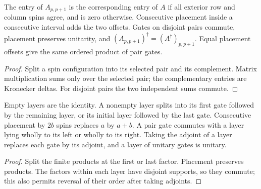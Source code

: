 \begin{lemma}
    \label{lem:mpu_printed_placement}
    \leanok
    The entry of $A_{p,p+1}$ is the corresponding entry of $A$ if all
    exterior row and column spins agree, and is zero otherwise.
    Consecutive placement inside a consecutive interval adds the two
    offsets. Gates on disjoint pairs commute, placement preserves
    unitarity, and $(A_{p,p+1})^\dagger=(A^\dagger)_{p,p+1}$.
    Equal placement offsets give the same ordered product of pair gates.
\end{lemma}
\begin{proof}\leanok
    Split a spin configuration into its selected pair and its complement.
    Matrix multiplication sums only over the selected pair; the
    complementary entries are Kronecker deltas. For disjoint pairs the
    two independent sums commute.
\end{proof}

\begin{lemma}
    \label{lem:mpu_printed_layer_identities}
    \leanok
    Empty layers are the identity. A nonempty layer splits into its first
    gate followed by the remaining layer, or its initial layer followed
    by the last gate. Consecutive placement by $2b$ spins replaces $a$
    by $a+b$. A pair gate commutes with a layer lying wholly to its left
    or wholly to its right. Taking the adjoint of a layer replaces each
    gate by its adjoint, and a layer of unitary gates is unitary.
\end{lemma}
\begin{proof}\leanok
    Split the finite products at the first or last factor. Placement
    preserves products. The factors within each layer have disjoint
    supports, so they commute; this also permits reversal of their order
    after taking adjoints.
\end{proof}

